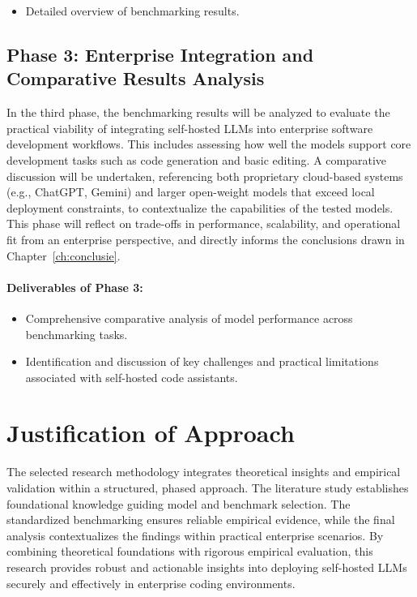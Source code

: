 \begin{itemize}
	\item Detailed overview of benchmarking results.
\end{itemize}

\subsection{Phase 3: Enterprise Integration and Comparative Results Analysis}

In the third phase, the benchmarking results will be analyzed to evaluate the practical viability of integrating self-hosted \glspl{LLM} into enterprise software development workflows. This includes assessing how well the models support core development tasks such as code generation and basic editing. A comparative discussion will be undertaken, referencing both proprietary cloud-based systems (e.g., ChatGPT, Gemini) and larger open-weight models that exceed local deployment constraints, to contextualize the capabilities of the tested models. This phase will reflect on trade-offs in performance, scalability, and operational fit from an enterprise perspective, and directly informs the conclusions drawn in Chapter~\ref{ch:conclusie}.

\paragraph{Deliverables of Phase 3:}

\begin{itemize}
	\item Comprehensive comparative analysis of model performance across benchmarking tasks.
	\item Identification and discussion of key challenges and practical limitations associated with self-hosted  code assistants.
\end{itemize}

\section{Justification of Approach}
\label{sec:justification-of-approach}

The selected research methodology integrates theoretical insights and empirical validation within a structured, phased approach. The literature study establishes foundational knowledge guiding model and benchmark selection. The standardized benchmarking ensures reliable empirical evidence, while the final analysis contextualizes the findings within practical enterprise scenarios.
By combining theoretical foundations with rigorous empirical evaluation, this research provides robust and actionable insights into deploying self-hosted \glspl{LLM} securely and effectively in enterprise coding environments.

